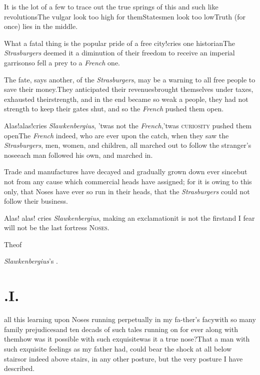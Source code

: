 \documentclass{article}
\begin{document}
It is the lot of a few to trace out the true springs of this and
such like revolutions\tsk The vulgar look too high for
them\tsk Statesmen look too low\tsk Truth (for once)
lies in the middle.

\newpage
What a fatal thing is the popular pride of a free city!\@ cries
one historian\tsk The \textit{Strasburgers} deemed it a diminution
of their freedom to receive an imperial garrison\tsk so
fell a prey to a \textit{French} one.

The fate, says another, of the \textit{Strasburgers}, may be a
warning to all free people to save their money.\tsk They
anticipated their revenues\tsk brought themselves under
taxes, exhausted their\break strength, and in the end became so weak a
people, they had not strength to keep their gates shut, and so the
\textit{French} pushed them open.

Alas!\@ alas!\@ cries \textit{Slawkenbergius}, ’twas not the
\textit{French},\tsk ’twas \textsc{curiosity}
pushed them open\tsk The \textit{French} indeed, who are
ever upon the catch, when they saw the \textit{Strasburgers}, men,
women, and children, all marched out to follow the stranger’s
nose\tsh each man followed his own, and marched in.

Trade and manufactures have decayed and gradually grown down
ever since\tsk but not from any cause which commercial heads have
assigned; for it is owing to this only, that Noses have ever so run
in their heads, that the \textit{Strasburgers} could not follow their
business.

Alas! alas! cries \textit{Slawkenbergius}, ma\-king an
exclamation\tsk it is not the first\tsh and I fear will not be the last
fortress
\break
\textsc{Noses}.

\bigskip
\centerline{The\enspace {}\enspace of}
\centerline{\textit{Slawkenbergius}’s .}

\bigskip

\newpage
\section{.\enspace I.}

 all this learning upon Noses
running perpetually in my fa-\break ther’s facy\sic\tsk with so
many family prejudices\tsk and ten decads of such tales
running on for ever along with them\tsk how was it possible
with such exquisite\tsk was it a true nose?\tsk That a man
with such exquisite feelings as my father had, could bear
the shock at all below stairs\tsk or indeed above stairs, in
any other posture, but the very posture I have described.
\end{document}
